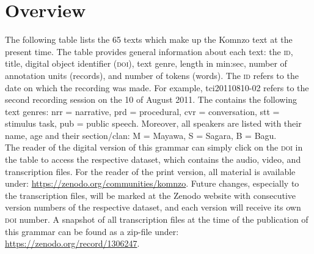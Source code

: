 
\appendix
{}

\section*{Overview}\label{corpusov}
	The following table lists the 65 texts which make up the Komnzo text  at the present time. The table provides general information about each text: the  \textsc{id}, title, digital object identifier (\textsc{doi}), text genre, length in min:sec, number of annotation units (records), and number of tokens (words). The  \textsc{id} refers to the date on which the recording was made. For example, tci20110810-02 refers to the second recording session on the 10 of August 2011. The  contains the following text genres: nrr = narrative, prd = procedural, cvr = conversation, stt = stimulus task, pub = public speech. Moreover, all speakers are listed with their name, age and their section/clan: M = Mayawa, S = Sagara, B = Bagu.\\
	
	The reader of the digital version of this grammar can simply click on the \textsc{doi} in the table to access the respective dataset, which contains the audio, video, and transcription files. For the reader of the print version, all material is available under: \href{https://zenodo.org/communities/komnzo}{https://zenodo.org/communities/komnzo}. Future changes, especially to the transcription files, will be marked at the Zenodo website with consecutive version numbers of the respective dataset, and each version will receive its own \textsc{doi} number. A snapshot of all transcription files at the time of the publication of this grammar can be found as a zip-file under: \href{https://zenodo.org/record/1306247}{https://zenodo.org/record/1306247}.\\
	

